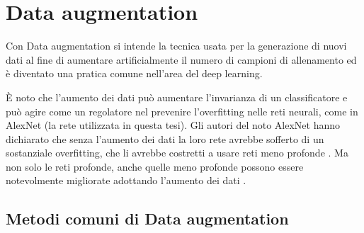 \chapter{Data augmentation}\label{data-augmentation}

Con Data augmentation si intende la tecnica usata per la generazione di nuovi dati  al fine di aumentare artificialmente il numero di campioni di allenamento ed è diventato una pratica comune nell'area del deep learning.

È noto che l'aumento dei dati può aumentare l'invarianza di un classificatore e può agire come un regolatore nel prevenire l'overfitting nelle reti neurali, come in AlexNet (la rete utilizzata in questa tesi). Gli autori del noto AlexNet  hanno dichiarato che senza l'aumento dei dati la loro rete avrebbe sofferto di un sostanziale overfitting, che li avrebbe costretti a usare reti meno profonde \cite{alexnet}. Ma non solo le reti profonde, anche quelle meno profonde  possono essere notevolmente migliorate adottando l'aumento dei dati \cite{dataaugmentation}.


\section{Metodi comuni di Data augmentation}\label{metodi-comuni-di-data-augmentation}

